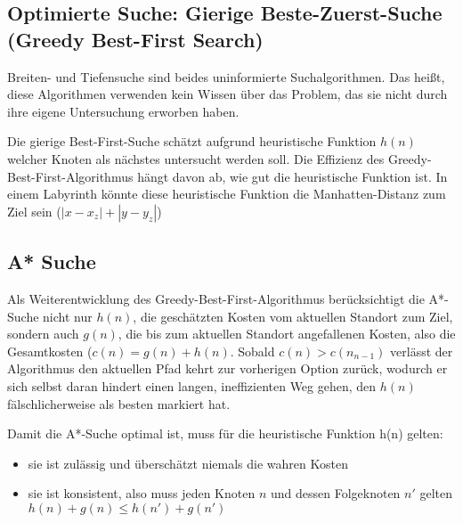 \subsection{Optimierte Suche: Gierige Beste-Zuerst-Suche (Greedy Best-First Search)}
Breiten- und Tiefensuche sind beides uninformierte Suchalgorithmen. Das heißt, diese Algorithmen verwenden kein Wissen über das Problem, das sie nicht durch ihre eigene Untersuchung erworben haben. 

Die gierige Best-First-Suche schätzt aufgrund heuristische Funktion $h(n)$ welcher Knoten als nächstes untersucht werden soll. Die Effizienz des Greedy-Best-First-Algorithmus hängt davon ab, wie gut die heuristische Funktion ist. In einem Labyrinth könnte diese heuristische Funktion die Manhatten-Distanz zum Ziel sein ($|x - x_z| + |y - y_z|$)

\subsection{A* Suche}
Als Weiterentwicklung des Greedy-Best-First-Algorithmus berücksichtigt die A*-Suche nicht nur $h(n)$, die geschätzten Kosten vom aktuellen Standort zum Ziel, sondern auch $g(n)$, die bis zum aktuellen Standort angefallenen Kosten, also die Gesamtkosten ($c(n) = g(n) + h(n)$. Sobald $c(n) > c(n_{n-1})$ verlässt der Algorithmus den aktuellen Pfad kehrt zur vorherigen Option zurück, wodurch er sich selbst daran hindert einen langen, ineffizienten Weg gehen, den $h(n)$ fälschlicherweise als besten markiert hat.

Damit die A*-Suche optimal ist, muss für die heuristische Funktion h(n) gelten:
\begin{itemize}
 \item sie ist zulässig und überschätzt niemals die wahren Kosten
 \item sie ist konsistent, also muss jeden Knoten $n$ und dessen Folgeknoten $n'$ gelten $h(n) + g(n) \leq h(n') + g(n')$

\end{itemize}
